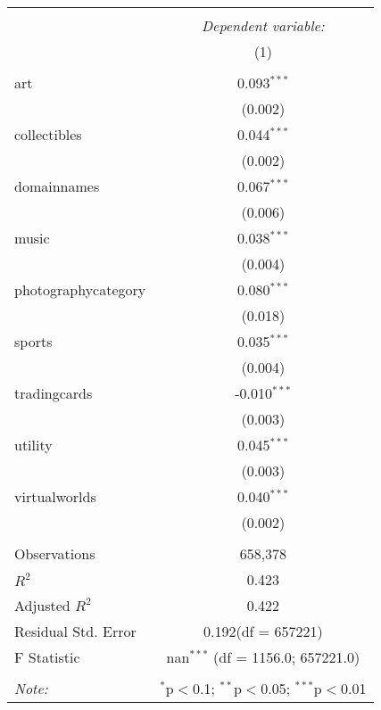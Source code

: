 \begin{table}[!htbp] \centering
\begin{tabular}{@{\extracolsep{5pt}}lc}
\\[-1.8ex]\hline
\hline \\[-1.8ex]
& \multicolumn{1}{c}{\textit{Dependent variable:}} \
\cr \cline{1-2}
\\[-1.8ex] & (1) \\
\hline \\[-1.8ex]
 art & 0.093$^{***}$ \\
  & (0.002) \\
 collectibles & 0.044$^{***}$ \\
  & (0.002) \\
 domainnames & 0.067$^{***}$ \\
  & (0.006) \\
 music & 0.038$^{***}$ \\
  & (0.004) \\
 photographycategory & 0.080$^{***}$ \\
  & (0.018) \\
 sports & 0.035$^{***}$ \\
  & (0.004) \\
 tradingcards & -0.010$^{***}$ \\
  & (0.003) \\
 utility & 0.045$^{***}$ \\
  & (0.003) \\
 virtualworlds & 0.040$^{***}$ \\
  & (0.002) \\
\hline \\[-1.8ex]
 Observations & 658,378 \\
 $R^2$ & 0.423 \\
 Adjusted $R^2$ & 0.422 \\
 Residual Std. Error & 0.192(df = 657221)  \\
 F Statistic & nan$^{***}$ (df = 1156.0; 657221.0) \\
\hline
\hline \\[-1.8ex]
\textit{Note:} & \multicolumn{1}{r}{$^{*}$p$<$0.1; $^{**}$p$<$0.05; $^{***}$p$<$0.01} \\
\end{tabular}
\end{table}
